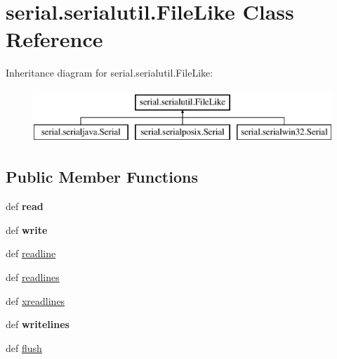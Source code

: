 \hypertarget{classserial_1_1serialutil_1_1_file_like}{\section{serial.\-serialutil.\-File\-Like Class Reference}
\label{classserial_1_1serialutil_1_1_file_like}
}
Inheritance diagram for serial.\-serialutil.\-File\-Like\-:\begin{figure}[H]
\begin{center}
\leavevmode
\includegraphics[height=2.000000cm]{classserial_1_1serialutil_1_1_file_like}
\end{center}
\end{figure}
\subsection*{Public Member Functions}
\begin{DoxyCompactItemize}
\item 
\hypertarget{classserial_1_1serialutil_1_1_file_like_a02ccce9ac927311b73130cb084ce3b4f}{def {\bfseries read}}\label{classserial_1_1serialutil_1_1_file_like_a02ccce9ac927311b73130cb084ce3b4f}

\item 
\hypertarget{classserial_1_1serialutil_1_1_file_like_a4ff22b47bd5fdc0fac01b9a409384e5b}{def {\bfseries write}}\label{classserial_1_1serialutil_1_1_file_like_a4ff22b47bd5fdc0fac01b9a409384e5b}

\item 
def \hyperlink{classserial_1_1serialutil_1_1_file_like_a35da6b9eacf5d3b7dd7ee0acd27ea719}{readline}
\item 
def \hyperlink{classserial_1_1serialutil_1_1_file_like_af5ce1f0e6f2b3358cb0b635f89b6dc75}{readlines}
\item 
def \hyperlink{classserial_1_1serialutil_1_1_file_like_a47d04aa3d47054b1fb285d120b0cbbf9}{xreadlines}
\item 
\hypertarget{classserial_1_1serialutil_1_1_file_like_a563678bf0045c4d3efa1787b521c45f5}{def {\bfseries writelines}}\label{classserial_1_1serialutil_1_1_file_like_a563678bf0045c4d3efa1787b521c45f5}

\item 
def \hyperlink{classserial_1_1serialutil_1_1_file_like_ad928665200ce30593f7a86c52e1fb061}{flush}
\end{DoxyCompactItemize}


